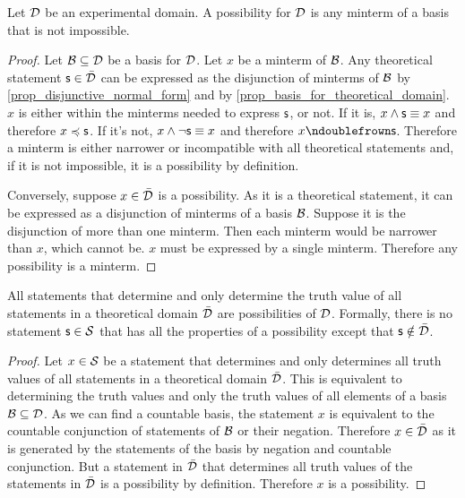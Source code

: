 \documentclass[11pt,letterpaper,fleqn]{memoir} %
\begin{document}
\begin{mathSection}
	
\begin{prop}\label{prop_poss_is_minterm}
	Let $\mathcal{D}$ be an experimental domain. A possibility for $\mathcal{D}$ is any minterm of a basis that is not impossible.
\end{prop}

\begin{proof}
	Let $\mathcal{B} \subseteq \mathcal{D}$ be a basis for $\mathcal{D}$. Let $x$ be a minterm of $\mathcal{B}$. Any theoretical statement $\mathsf{s} \in \bar{\mathcal{D}}$ can be expressed as the disjunction of minterms of $\mathcal{B}$ by \ref{prop_disjunctive_normal_form} and by \ref{prop_basis_for_theoretical_domain}. $x$ is either within the minterms needed to express $\mathsf{s}$, or not. If it is, $x \wedge \mathsf{s} \equiv x$ and therefore $x \preccurlyeq \mathsf{s}$. If it's not, $x \wedge \neg \mathsf{s} \equiv x$ and therefore $x \ncomp \stmt$. Therefore a minterm is either narrower or incompatible with all theoretical statements and, if it is not impossible, it is a possibility by definition.
	
	Conversely, suppose $x \in \bar{\mathcal{D}}$ is a possibility. As it is a theoretical statement, it can be expressed as a disjunction of minterms of a basis $\mathcal{B}$. Suppose it is the disjunction of more than one minterm. Then each minterm would be narrower than $x$, which cannot be. $x$ must be expressed by a single minterm. Therefore any possibility is a minterm.
\end{proof}

\begin{prop}
	All statements that determine and only determine the truth value of all statements in a theoretical domain $\bar{\mathcal{D}}$ are possibilities of $\mathcal{D}$. Formally, there is no statement $\mathsf{s} \in \mathcal{S}$ that has all the properties of a possibility except that $\mathsf{s} \notin \bar{\mathcal{D}}$.
\end{prop}

\begin{proof}
	Let $x \in \mathcal{S}$ be a statement that determines and only determines all truth values of all statements in a theoretical domain $\bar{\mathcal{D}}$. This is equivalent to determining the truth values and only the truth values of all elements of a basis $\mathcal{B} \subseteq \mathcal{D}$. As we can find a countable basis, the statement $x$ is equivalent to the countable conjunction of statements of $\mathcal{B}$ or their negation. Therefore $x \in \bar{\mathcal{D}}$ as it is generated by the statements of the basis by negation and countable conjunction. But a statement in $\bar{\mathcal{D}}$ that determines all truth values of the statements in $\bar{\mathcal{D}}$ is a possibility by definition. Therefore $x$ is a possibility.
\end{proof}
\end{mathSection}
\end{document}
